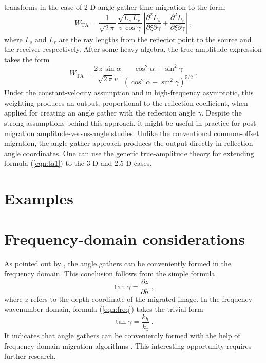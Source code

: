 \cite[]{Fomel.sep.92.267} transforms in the case of 2-D angle-gather
time migration to the form:
\begin{equation}
  \label{eqn:ta}
  W_{\mbox{TA}} = \frac{1}{\sqrt{2\,\pi}}\,
  \frac{\sqrt{L_s\,L_r}}{v\,\cos{\gamma}}\,
  \left|\frac{\partial^2 L_s}{\partial \xi \partial \gamma} +
    \frac{\partial^2 L_r}{\partial \xi \partial \gamma} 
  \right|\;,  
\end{equation}
where $L_s$ and $L_r$ are the ray lengths from the reflector point to
the source and the receiver respectively. After some heavy algebra,
the true-amplitude expression takes the form
\begin{equation}
  \label{eqn:ta1}
  W_{\mbox{TA}} = \frac{2\,z\,\sin{\alpha}}{\sqrt{2\,\pi} v}\,
  \frac{\cos^2{\alpha} + \sin^2{\gamma}}
  {\left(\cos^2{\alpha} - \sin^2{\gamma}\right)^{5/2}}\;.
\end{equation}
Under the constant-velocity assumption and in high-frequency
asymptotic, this weighting produces an output, proportional to the
reflection coefficient, when applied for creating an angle gather with
the reflection angle $\gamma$. Despite the strong assumptions behind
this approach, it might be useful in practice for post-migration
amplitude-versus-angle studies. Unlike the conventional common-offset
migration, the angle-gather approach produces the output directly in
reflection angle coordinates. One can use the generic true-amplitude
theory \cite[]{Fomel.sep.92.267} for extending formula (\ref{eqn:ta1})
to the 3-D and 2.5-D cases.

\section{Examples}



\section{Frequency-domain considerations}

As pointed out by \cite{Prucha.sep.100.marie1}, the angle gathers
can be conveniently formed in the frequency domain. This conclusion
follows from the simple formula \cite[]{Fomel.sep.92.159}
\begin{equation}
  \label{eqn:freq}
  \tan{\gamma} = \frac{\partial z}{\partial h}\;,
\end{equation}
where $z$ refers to the depth coordinate of the migrated image. In the
frequency-wavenumber domain, formula (\ref{eqn:freq}) takes the
trivial form
\begin{equation}
  \label{eqn:freq1}
  \tan{\gamma} = \frac{k_h}{k_z}\;.
\end{equation}
It indicates that angle gathers can be conveniently formed with the help
of frequency-domain migration algorithms \cite[]{GEO43.01.00230048}.
This interesting opportunity requires further research.

